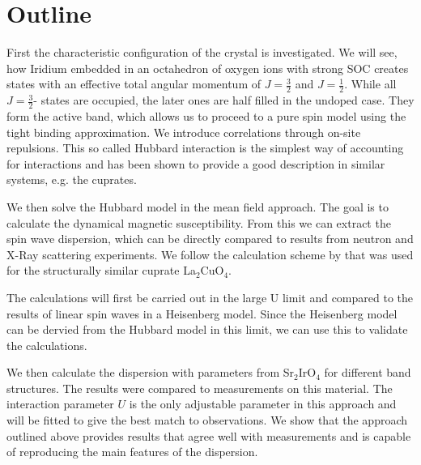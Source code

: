 




\section{Outline}

First the characteristic configuration of the crystal is  investigated.
We will see, how Iridium embedded in an octahedron of oxygen ions  with strong  SOC
creates states with an effective total angular momentum of $J=\frac32$ and $J=\frac12$.
While all $J=\frac32$- states are occupied, the later ones are half filled in the undoped case.
They form the active band, which allows us to proceed to a pure spin model using the tight binding approximation.
We introduce  correlations through on-site repulsions. 
This so called Hubbard interaction is the simplest way of accounting for interactions 
and has been shown to provide a good description in similar systems, e.g. the cuprates.

We then solve the Hubbard model in the mean field approach.
The goal is to calculate the dynamical magnetic susceptibility.
From this we can extract the spin wave dispersion, which 
can be directly compared to results from neutron and X-Ray scattering experiments.
We follow the calculation scheme by  \citet{PhysRevB.65.132404} that was used for the structurally similar cuprate La$_2$CuO$_4$.

The calculations will first be carried out in the large U limit and compared to the results of linear spin waves in a Heisenberg model.
Since the Heisenberg model can be dervied from the Hubbard model in this limit, we can use this to validate the calculations.

We then calculate the dispersion with parameters from Sr$_2$IrO$_4$ for different band structures.
The results were compared to measurements on this material. 
The interaction parameter $U$ is the only adjustable parameter in this approach and will be fitted to give the best match to observations.
We show that the approach outlined above provides results that agree well with measurements and is capable of reproducing the main features of the dispersion.
%


